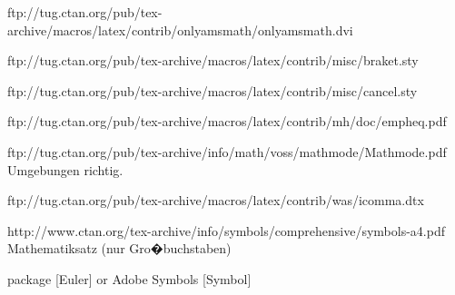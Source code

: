 ftp://tug.ctan.org/pub/tex-archive/macros/latex/contrib/onlyamsmath/onlyamsmath.dvi
\usepackage[
all,
warning
]{onlyamsmath}





ftp://tug.ctan.org/pub/tex-archive/macros/latex/contrib/misc/braket.sty
\usepackage{braket} %

ftp://tug.ctan.org/pub/tex-archive/macros/latex/contrib/misc/cancel.sty
\usepackage{cancel} %

ftp://tug.ctan.org/pub/tex-archive/macros/latex/contrib/mh/doc/empheq.pdf
\usepackage{empheq} %

ftp://tug.ctan.org/pub/tex-archive/info/math/voss/mathmode/Mathmode.pdf
Umgebungen richtig.

ftp://tug.ctan.org/pub/tex-archive/macros/latex/contrib/was/icomma.dtx
\usepackage{icomma}



%
\let\ORGvarepsilon=\varepsilon
\let\varepsilon=\epsilon
\let\epsilon=\ORGvarepsilon
%
%

%
http://www.ctan.org/tex-archive/info/symbols/comprehensive/symbols-a4.pdf
%
Mathematiksatz (nur Gro�buchstaben)
\usepackage[Symbolsmallscale]{upgreek} %
package [Euler] or Adobe Symbols [Symbol]
\usepackage[upmu]{gensymb} %

